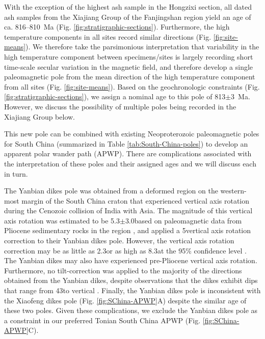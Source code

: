 With the exception of the highest ash sample in the Hongzixi section, all dated ash samples from the Xiajiang Group of the Fanjingshan region yield an age of ca. 816--810~Ma (Fig. \ref{fig:stratigraphic-sections}). Furthermore, the high temperature components in all sites record similar directions (Fig. \ref{fig:site-means}). We therefore take the parsimonious interpretation that variability in the high temperature component between specimens/sites is largely recording short time-scale secular variation in the magnetic field, and therefore develop a single paleomagnetic pole from the mean direction of the high temperature component from all sites (Fig. \ref{fig:site-means}). Based on the geochronologic constraints (Fig. \ref{fig:stratigraphic-sections}), we assign a nominal age to this pole of 813$\pm$3~Ma. However, we discuss the possibility of multiple poles being recorded in the Xiajiang Group below.

This new pole can be combined with existing Neoproterozoic paleomagnetic poles for South China (summarized in Table \ref{tab:South-China-poles}) to develop an apparent polar wander path (APWP). There are complications associated with the interpretation of these poles and their assigned ages and we will discuss each in turn.

The Yanbian dikes pole \citep{Niu2016a} was obtained from a deformed region on the western-most margin of the South China craton that experienced vertical axis rotation during the Cenozoic collision of India with Asia. The magnitude of this vertical axis rotation was estimated to be 5.3$\pm$3.0\degrees based on paleomagnetic data from Pliocene sedimentary rocks in the region \citep{Zhu2008a}, and \citet{Niu2016a} applied a 5\degrees vertical axis rotation correction to their Yanbian dikes pole. However, the vertical axis rotation correction may be as little as 2.3\degrees or as high as 8.3\degrees at the 95\% confidence level \citep{Zhu2008a}. The Yanbian dikes may also have experienced pre-Pliocene vertical axis rotation. Furthermore, no tilt-correction was applied to the majority of the directions obtained from the Yanbian dikes, despite observations that the dikes exhibit dips that range from 43\degrees to vertical \citep{Niu2016a}. Finally, the Yanbian dikes pole is inconsistent with the Xiaofeng dikes pole (Fig. \ref{fig:SChina-APWP}A) despite the similar age of these two poles. Given these complications, we exclude the Yanbian dikes pole as a constraint in our preferred Tonian South China APWP (Fig. \ref{fig:SChina-APWP}C).

